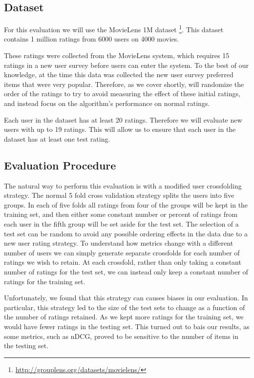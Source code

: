 \documentclass[letterpaper]{sig-alternate}
\begin{document}
  
  \subsection*{Dataset}
  For this evaluation we will use the MovieLens 1M dataset \footnote{\url{http://grouplens.org/datasets/movielens/}}.
  This dataset contains 1 million ratings from 6000 users on 4000 movies.
  
  These ratings were collected from the MovieLens system, which requires 15 ratings in a new user survey before users can enter the system.
  To the best of our knowledge, at the time this data was collected the new user survey preferred items that were very popular.
  Therefore, as we cover shortly, will randomize the order of the ratings to try to avoid measuring the effect of these initial ratings, and instead focus on the algorithm's performance on normal ratings.
  
  Each user in the dataset has at least 20 ratings.
  Therefore we will evaluate new users with up to 19 ratings.
  This will allow us to ensure that each user in the dataset has at least one test rating.

  
  \subsection*{Evaluation Procedure}
  The natural way to perform this evaluation is with a modified user crossfolding strategy.
  The normal 5 fold cross validation strategy splits the users into five groups.
  In each of five folds all ratings from four of the groups will be kept in the training set, and then either some constant number or percent of ratings from each user in the fifth group will be set aside for the test set.
  The selection of a test set can be random to avoid any possible ordering effects in the data due to a new user rating strategy.
  To understand how metrics change with a different number of users we can simply generate separate crossfolds for each number of ratings we wish to retain.
  At each crossfold, rather than only taking a constant number of ratings for the test set, we can instead only keep a constant number of ratings for the training set.
  
  Unfortunately, we found that this strategy can causes biases in our evaluation.
  In particular, this strategy led to the size of the test sets to change as a function of the number of ratings retained.
  As we kept more ratings for the training set, we would have fewer ratings in the testing set.
  This turned out to bais our results, as some metrics, such as nDCG, proved to be sensitive to the number of items in the testing set.
  
\end{document}
